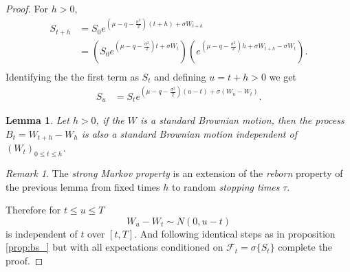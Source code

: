 \documentclass{article}
\newtheorem{lem}[thm]{Lemma}
\theoremstyle{definition}
\theoremstyle{remark}
\newtheorem{remark}[thm]{Remark}
\newcommand{\filtration}[1]{\ensuremath{\mathscr{F}_{#1}}}
\begin{document}
\begin{proof}
For $h>0$,
\begin{align*}
S_{t+h}&=S_0e^{(\mu-q-\frac{\sigma^2}{2})(t+h)+\sigma W_{t+h}}\\
&=\left( S_0e^{(\mu-q-\frac{\sigma^2}{2})t+\sigma W_{t}} \right) \left( e^{(\mu-q-\frac{\sigma^2}{2})h+\sigma W_{t+h}-\sigma W_{t}} \right).\\
\end{align*}
Identifying the the first term as $S_t$ and defining $u=t+h>0$ we get
\begin{align*}
S_{u}&=S_te^{(\mu-q-\frac{\sigma^2}{2})(u-t)+\sigma (W_{u}- W_{t})}.
\end{align*}

\begin{lem}
Let $h>0$, if the $W$ is a standard Brownian motion, then the process $B_t=W_{t+h}-W_h$ is also a standard Brownian motion independent of $(W_t)_{0\leq t \leq h}$.
\end{lem}


\begin{remark}
The \emph{strong Markov property} is an extension of the \emph{reborn} property of the previous lemma from fixed times $h$ to random \emph{stopping times} $\tau$. 
\end{remark}


Therefore for $t\leq u \leq T$
$$W_u-W_t \sim N(0, u-t)$$
is independent of $t$ over $[t,T]$. And following identical steps as in proposition \ref{prop:bs_} but with all expectations conditioned on $\filtration{t}=\sigma\{S_t\}$ complete the proof.
\end{proof}
\end{document}

